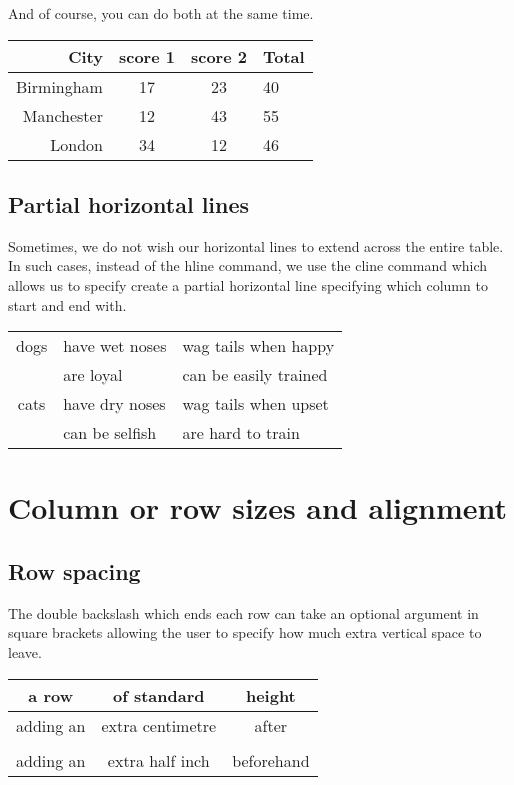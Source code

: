 \documentclass[a4paper,11pt]{article}
\begin{document}
And of course, you can do both at the same time.
\begin{table}[!htbp]
	\centering
	\begin{tabular}{r || c | c || l }
		\hline
		City       & score 1 & score 2 & Total \\
		\hline \hline
		Birmingham & 17      & 23      & 40\\
		Manchester & 12      & 43      & 55 \\
		London     & 34      & 12      & 46\\
	\hline
	\end{tabular}
\end{table}

\subsection{Partial horizontal lines}

Sometimes, we do not wish our horizontal lines to extend across the entire table. In such cases, instead of the hline command, we use the cline command which allows us to specify create a partial horizontal line specifying which column to start and end with.
%
\begin{table}[!hbtp]
	\centering
		\begin{tabular}{| c | l | l |}
		\hline
		dogs 	& have wet noses & wag tails when happy \\
		\cline{2-3} %
	     		& are loyal      & can be easily trained\\
		\hline
		cats 	& have dry noses & wag tails when upset\\
		\cline{2-3}
 	    		& can be selfish & are hard to train\\
		\hline
	\end{tabular}
\end{table}

\pagebreak

\section{Column or row sizes and alignment}

\subsection{Row spacing}

The double backslash which ends each row can take an optional argument in square brackets allowing the user to specify how much extra vertical space to leave.
%
\begin{table}[hbtp]
	\centering
	\begin{tabular}{| c | c | c |}
		\hline
		a row       & of standard       & height\\
		\hline
		adding an   & extra centimetre  & after\\[1cm]
		\hline
		 			&					& \\[0.5 in]
		adding an   & extra  half inch  & beforehand\\
		\hline
		\end{tabular}
\end{table}
\end{document}
